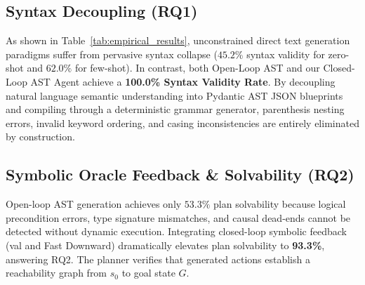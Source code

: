 \begin{table}[htbp]
\centering
\caption{Comprehensive Benchmark Performance Across IPC Domains (7 Core Lifecycle Metrics)}
\label{tab:empirical_results}
\end{table}

\subsection{Syntax Decoupling (RQ1)}
As shown in Table~\ref{tab:empirical_results}, unconstrained direct text generation paradigms suffer from pervasive syntax collapse ($45.2\%$ syntax validity for zero-shot and $62.0\%$ for few-shot). In contrast, both Open-Loop AST and our Closed-Loop AST Agent achieve a \textbf{100.0\% Syntax Validity Rate}. By decoupling natural language semantic understanding into Pydantic AST JSON blueprints and compiling through a deterministic grammar generator, parenthesis nesting errors, invalid keyword ordering, and casing inconsistencies are entirely eliminated by construction.

\subsection{Symbolic Oracle Feedback \& Solvability (RQ2)}
Open-loop AST generation achieves only $53.3\%$ plan solvability because logical precondition errors, type signature mismatches, and causal dead-ends cannot be detected without dynamic execution. Integrating closed-loop symbolic feedback (\gls{val} and Fast Downward) dramatically elevates plan solvability to \textbf{93.3\%}, answering RQ2. The planner verifies that generated actions establish a reachability graph from $s_0$ to goal state $G$.

